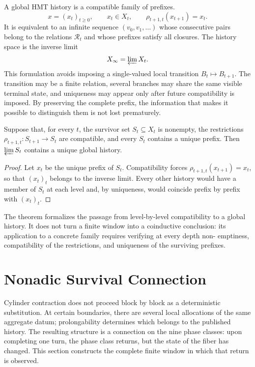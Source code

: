 A global HMT history is a compatible family of prefixes.
\[
x=(x_t)_{t\ge0},
\qquad
x_t\in X_t,
\qquad
\rho_{t+1,t}(x_{t+1})=x_t.
\]
It is equivalent to an infinite sequence \((v_0,v_1,\ldots)\) whose consecutive
pairs belong to the relations \(\mathcal R_t\) and whose prefixes
satisfy all closures. The history space is the inverse limit
\[
X_\infty=\varprojlim X_t.
\]
This formulation avoids imposing a single-valued local transition \(B_t\mapsto B_{t+1}\). The transition may be a finite relation, several branches may share the same visible terminal state, and uniqueness may appear only after future compatibility is imposed. By preserving the complete prefix, the information that makes it possible to distinguish them is not lost prematurely.

\begin{theorem}
Suppose that, for every \(t\), the survivor set \(S_t\subseteq
X_t\) is nonempty, the restrictions
\(\rho_{t+1,t}:S_{t+1}\to S_t\) are compatible, and every \(S_t\) contains a
unique prefix. Then \(\varprojlim S_t\) contains a unique global
history.
\end{theorem}

\begin{proof}
Let \(x_t\) be the unique prefix of \(S_t\). Compatibility forces
\(\rho_{t+1,t}(x_{t+1})=x_t\), so that \((x_t)_t\) belongs to the inverse
limit. Every other history would have a member of \(S_t\) at each level
and, by uniqueness, would coincide prefix by prefix with \((x_t)_t\).
\end{proof}

The theorem formalizes the passage from level-by-level compatibility to a global
history. It does not turn a finite window into a coinductive conclusion: its
application to a concrete family requires verifying at every depth non-
emptiness, compatibility of the restrictions, and uniqueness of the
surviving prefixes.

\section{Nonadic Survival Connection}
\label{sec:conexion-nonadica}

Cylinder contraction does not proceed block by block as a deterministic substitution. At certain boundaries, there are several local allocations of the same aggregate datum; prolongability determines which belongs to the published history. The resulting structure is a connection on the nine phase classes: upon completing one turn, the phase class returns, but the state of the fiber has changed. This section constructs the complete finite window in which that return is observed.

